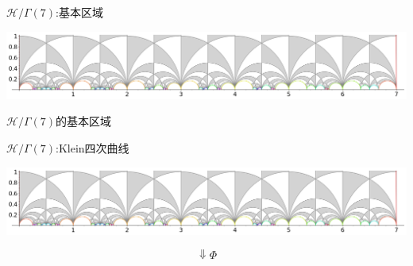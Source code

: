 \documentclass[pdf]{beamer}
\numberwithin{equation}{section}
\theoremstyle{plain}
\theoremstyle{plain}
\theoremstyle{remark}
\begin{document}
\begin{frame}{$\mathcal{H}/\Gamma(7)$:基本区域}
\begin{table}[ht]
	\centering
	\includegraphics[width=1\textwidth]{sage/X(7).png}
	\caption{$\mathcal{H}/\Gamma(7)$的基本区域}
\end{table}

\end{frame}
\begin{frame}{$\mathcal{H}/\Gamma(7)$:Klein四次曲线}
\begin{table}[ht]
	\centering
	\includegraphics[width=1\textwidth]{sage/X(7).png}
\end{table}
$$\Downarrow \Phi$$


\end{frame}
\end{document}
